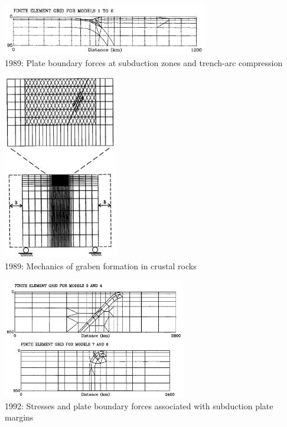 \begin{center}
\includegraphics[width=9cm]{images/history/boww89}\\
{\scriptsize 1989: Plate boundary forces at subduction zones and trench-arc compression \cite{boww89}}
\end{center}

\begin{center}
\begin{minipage}{0.35\textwidth}
\centering
\includegraphics[width=5cm]{images/history/mewi89}\\
{\scriptsize 1989: Mechanics of graben formation in crustal rocks \cite{mewi89}}
\end{minipage}\hfill
\begin{minipage}{0.55\textwidth}
\centering
\includegraphics[width=8cm]{images/history/whbw92}\\
{\scriptsize 1992: Stresses and plate boundary forces associated with subduction plate margins
\cite{whbw92}}
\end{minipage}
\end{center}


